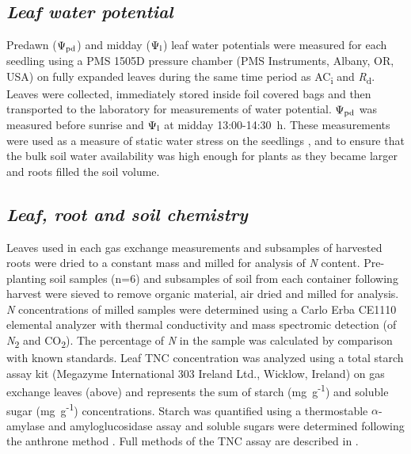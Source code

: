 \documentclass[a4paper]{article}\usepackage[]{graphicx}\usepackage[]{color}
\begin{document}
\subsection*{\textit{Leaf water potential}}
Predawn ($\Psi\textsubscript{pd}$) and midday ($\Psi\textsubscript{l}$) leaf water potentials were measured for each seedling using a PMS 1505D pressure chamber (PMS Instruments, Albany, OR, USA) on fully expanded leaves during the same time period as AC\textsubscript{i} and \textit{R}\textsubscript{d}. Leaves were collected, immediately stored inside foil covered bags and then transported to the laboratory for measurements of water potential. $\Psi\textsubscript{pd}$ was measured before sunrise and $\Psi\textsubscript{l}$ at midday 13:00-14:30~h. These measurements were used as a measure of static water stress on the seedlings \citep{sellin1999does}, and to ensure that the bulk soil water availability was high enough for plants as they became larger and roots filled the soil volume. 

\subsection*{\textit{Leaf, root and soil chemistry}}
Leaves used in each gas exchange measurements and subsamples of harvested roots were dried to a constant mass and milled for analysis of \textit{N} content. Pre-planting soil samples (n=6) and subsamples of soil from each container following harvest were sieved to remove organic material, air dried and milled for analysis. \textit{N} concentrations of milled samples were determined using a Carlo Erba CE1110 elemental analyzer with thermal conductivity and mass spectromic detection (of \textit{N}\textsubscript{2} and CO\textsubscript{2}).  The percentage of \textit{N} in the sample was calculated by comparison with known standards. Leaf TNC concentration was analyzed using a total starch assay kit (Megazyme International 303 Ireland Ltd., Wicklow, Ireland) on gas exchange leaves (above) and represents the sum of starch (mg~g\textsuperscript{-1}) and soluble sugar (mg~g\textsuperscript{-1}) concentrations. Starch was quantified using a thermostable $\alpha$-amylase and amyloglucosidase assay \citep{McCleary_starch} and soluble sugars were determined following the anthrone method \citep{ebell1969variation}. Full methods of the TNC assay are described in \citep{mitchell2013drought}.
\end{document}
